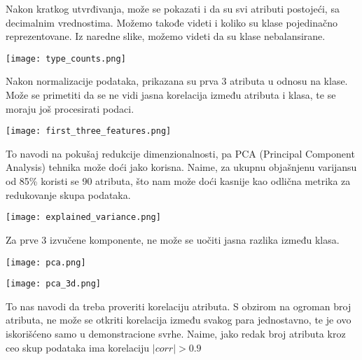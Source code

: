 \documentclass[a4paper]{article}
\begin{document}
    Nakon kratkog utvrđivanja, može se pokazati i da su svi atributi postojeći, sa decimalnim vrednostima. Možemo takođe videti i koliko su klase pojedinačno reprezentovane. Iz naredne slike, možemo videti da su klase nebalansirane.

    \begin{center}
        \label{im:type_counts}
        \texttt{[image: type\_counts.png]}
    \end{center}

    Nakon normalizacije podataka, prikazana su prva 3 atributa u odnosu na klase. Može se primetiti da se ne vidi jasna korelacija između atributa i klasa, te se moraju još procesirati podaci.
    \begin{center}
        \label{im:first_three_features}
        \texttt{[image: first\_three\_features.png]}
    \end{center}

    To navodi na pokušaj redukcije dimenzionalnosti, pa PCA (Principal Component Analysis) tehnika može doći jako korisna. Naime, za ukupnu objašnjenu varijansu od 85\% koristi se 90 atributa, što nam može doći kasnije kao odlična metrika za redukovanje skupa podataka.

    \begin{center}
        \label{im:explained_variance}
        \texttt{[image: explained\_variance.png]}
    \end{center}

    Za prve 3 izvučene komponente, ne može se uočiti jasna razlika između klasa.
    \begin{center}
        \label{im:pca}
        \texttt{[image: pca.png]}
    \end{center}

    \begin{center}
        \label{im:pca_3d}
        \texttt{[image: pca\_3d.png]}
    \end{center}
    
    To nas navodi da treba proveriti korelaciju atributa. S obzirom na ogroman broj atributa, ne može se otkriti korelacija između svakog para jednostavno, te je ovo iskorišćeno samo u demonstracione svrhe. Naime, jako redak broj atributa kroz ceo skup podataka ima korelaciju $ |corr| > 0.9 $
\end{document}
